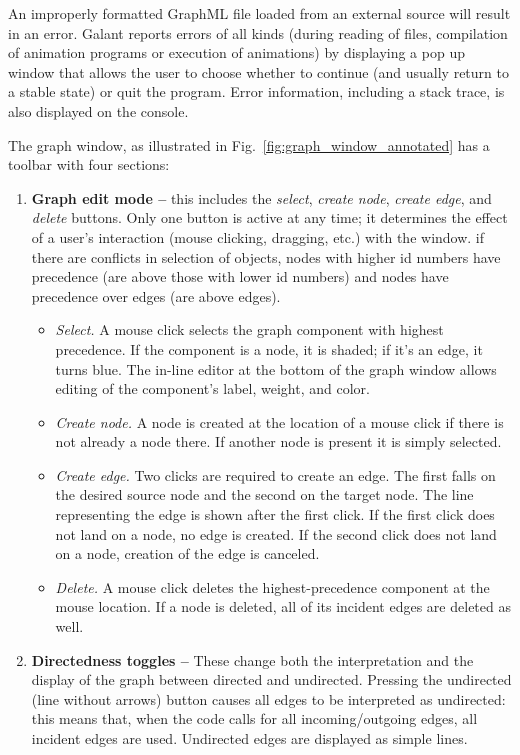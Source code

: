 An improperly formatted GraphML file loaded from an external source will
result in an error.
Galant reports errors of all kinds (during reading of files, compilation of
animation programs or execution of animations)
by displaying a pop up window that allows the user to choose whether to
continue (and usually return to a stable state) or quit the program.
Error information, including a stack trace, is also displayed on the console.

The graph window, as illustrated in Fig.~\ref{fig:graph_window_annotated}
has a toolbar with four sections:
\begin{enumerate}
\item
\textbf{Graph edit mode -- }
this includes the \emph{select}, \emph{create node}, \emph{create edge}, and \emph{delete} buttons.
Only one button is active at any time; it determines the effect
of a user's interaction (mouse clicking, dragging, etc.) with the window.
if there are conflicts in selection of objects, nodes with higher id numbers have precedence (are above those with lower id numbers) and nodes
have precedence over edges (are above edges).
\begin{itemize}
\item \emph{Select.} A mouse click selects the graph component with highest precedence.
If the component is a node, it is shaded; if it's an edge, it turns blue.
The in-line editor at the bottom of the graph window allows editing of the
component's label, weight, and color.
\item \emph{Create node.}
A node is created at the location of a mouse click if there is not already a node there.
If another node is present it is simply selected.
\item \emph{Create edge.}
Two clicks are required to create an edge. The first falls on the desired
source node and the second on the target node.
The line representing the edge is shown after the first click.
If the first click does not land on a node, no edge is created.
If the second click does not land on a node, creation of the edge is canceled.
\item \emph{Delete.}
A mouse click deletes the highest-precedence component at the mouse location.
If a node is deleted, all of its incident edges are deleted as well.
\end{itemize}

\item
\textbf{Directedness toggles --}
These change both the interpretation and the
display of the graph between directed and undirected.
Pressing the undirected (line without arrows) button causes
all edges to be interpreted as undirected: this means that, when the code
calls for all incoming/outgoing edges, all incident edges are used.
Undirected edges are displayed as simple lines.


\end{enumerate}
